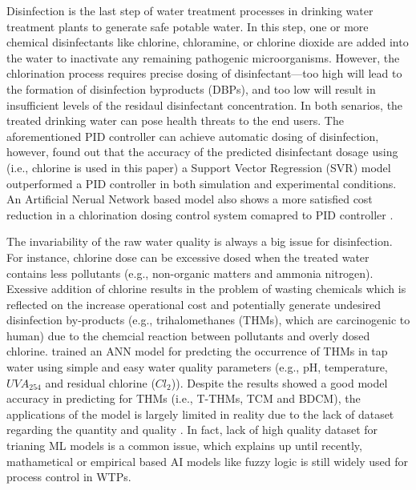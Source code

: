 Disinfection is the last step of water treatment processes in drinking water treatment plants to generate safe potable water. In this step, one or more chemical disinfectants like chlorine, chloramine, or chlorine dioxide are added into the water to inactivate any remaining pathogenic microorganisms. However, the chlorination process requires precise dosing of disinfectant---too high will lead to the formation of disinfection byproducts (DBPs), and too low will result in insufficient levels of the residaul disinfectant concentration. In both senarios, the treated drinking water can pose health threats to the end users. The aforementioned PID controller can achieve automatic dosing of disinfection, however, \citet{wangModelPredictiveControl2020} found out that the accuracy of the predicted disinfectant dosage using (i.e., chlorine is used in this paper) a Support Vector Regression (SVR) model outperformed a PID controller in both simulation and experimental conditions. An Artificial Nerual Network based model also shows a more satisfied cost reduction in a chlorination dosing control system comapred to PID controller \citep{librantzArtificialNeuralNetworks2018}.

The invariability of the raw water quality is always a big issue for disinfection. For instance, chlorine dose can be excessive dosed when the treated water contains less pollutants (e.g., non-organic matters and ammonia nitrogen). Exessive addition of chlorine results in the problem of wasting chemicals which is reflected on the increase operational cost and potentially generate undesired disinfection by-products (e.g., trihalomethanes (THMs), which are carcinogenic to human) due to the chemcial reaction between pollutants and overly dosed chlorine. \citet{xuUsingSimpleEasy2022} trained an ANN model for predcting the occurrence of THMs in tap water using simple and easy water quality parameters (e.g., pH, temperature, $UVA_{254}$ and residual chlorine ($Cl_{2}$)). Despite the results showed a good model accuracy in predicting for THMs (i.e., T-THMs, TCM and BDCM), the applications of the model is largely limited in reality due to the lack of dataset regarding the quantity and quality . In fact, lack of high quality dataset for trianing ML models is a common issue, which explains up until recently, mathametical or empirical based AI models like fuzzy logic \citep{gamizFuzzyGainScheduling2020,godo-plaControlPrimaryDisinfection2021} is still widely used for process control in WTPs.

